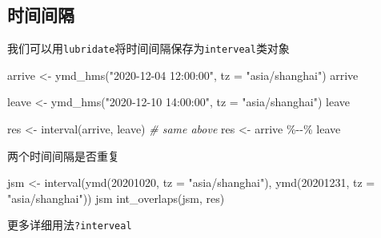 \documentclass[
]{book}
\newenvironment{Shaded}{\begin{snugshade}}{\end{snugshade}}
\newcommand{\AttributeTok}[1]{\textcolor[rgb]{0.77,0.63,0.00}{#1}}
\newcommand{\CommentTok}[1]{\textcolor[rgb]{0.56,0.35,0.01}{\textit{#1}}}
\newcommand{\DecValTok}[1]{\textcolor[rgb]{0.00,0.00,0.81}{#1}}
\newcommand{\FunctionTok}[1]{\textcolor[rgb]{0.00,0.00,0.00}{#1}}
\newcommand{\NormalTok}[1]{#1}
\newcommand{\OtherTok}[1]{\textcolor[rgb]{0.56,0.35,0.01}{#1}}
\newcommand{\SpecialCharTok}[1]{\textcolor[rgb]{0.00,0.00,0.00}{#1}}
\newcommand{\StringTok}[1]{\textcolor[rgb]{0.31,0.60,0.02}{#1}}
\begin{document}
\hypertarget{ux65f6ux95f4ux95f4ux9694}{%
\subsection{时间间隔}\label{ux65f6ux95f4ux95f4ux9694}}

我们可以用\texttt{lubridate}将时间间隔保存为\texttt{interveal}类对象

\begin{Shaded}
\begin{Highlighting}[]
\NormalTok{arrive }\OtherTok{\textless{}{-}} \FunctionTok{ymd\_hms}\NormalTok{(}\StringTok{"2020{-}12{-}04 12:00:00"}\NormalTok{, }\AttributeTok{tz =} \StringTok{"asia/shanghai"}\NormalTok{)}
\NormalTok{arrive}

\NormalTok{leave }\OtherTok{\textless{}{-}} \FunctionTok{ymd\_hms}\NormalTok{(}\StringTok{"2020{-}12{-}10 14:00:00"}\NormalTok{, }\AttributeTok{tz =} \StringTok{"asia/shanghai"}\NormalTok{)}
\NormalTok{leave}

\NormalTok{res }\OtherTok{\textless{}{-}} \FunctionTok{interval}\NormalTok{(arrive, leave) }
\CommentTok{\# same above}
\NormalTok{res }\OtherTok{\textless{}{-}}\NormalTok{ arrive }\SpecialCharTok{\%{-}{-}\%}\NormalTok{ leave}
\end{Highlighting}
\end{Shaded}

两个时间间隔是否重复

\begin{Shaded}
\begin{Highlighting}[]
\NormalTok{jsm }\OtherTok{\textless{}{-}} \FunctionTok{interval}\NormalTok{(}\FunctionTok{ymd}\NormalTok{(}\DecValTok{20201020}\NormalTok{, }\AttributeTok{tz =} \StringTok{"asia/shanghai"}\NormalTok{), }\FunctionTok{ymd}\NormalTok{(}\DecValTok{20201231}\NormalTok{, }\AttributeTok{tz =} \StringTok{"asia/shanghai"}\NormalTok{))}
\NormalTok{jsm}
\FunctionTok{int\_overlaps}\NormalTok{(jsm, res)}
\end{Highlighting}
\end{Shaded}

更多详细用法\texttt{?interveal}
\end{document}

